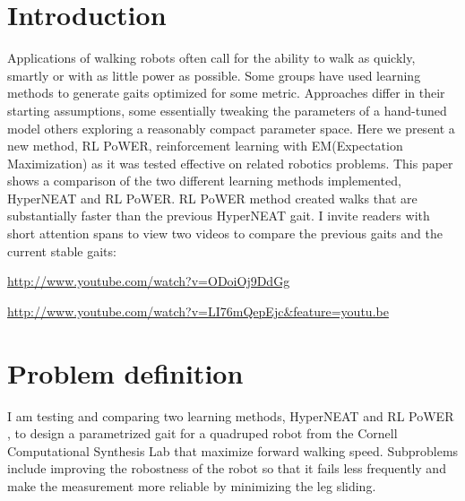 \section{Introduction}


Applications of walking robots often call for the ability to walk as
quickly, smartly or with as little power as possible. Some groups have
used learning methods to generate gaits optimized for some metric.
Approaches differ in their starting assumptions, some essentially
tweaking the parameters of a hand-tuned model others
exploring a reasonably compact parameter space.
Here we present a new method, RL PoWER, reinforcement learning with EM(Expectation Maximization) as it was tested effective on related robotics problems. 
This paper shows a comparison of the two different learning methods 
implemented, HyperNEAT and RL PoWER.  RL PoWER
method created walks that are substantially faster than the previous
HyperNEAT gait. I invite readers with short attention spans to view
two videos to compare the previous gaits and the current stable gaits:

\url{http://www.youtube.com/watch?v=ODoiOj9DdGg}

\url{http://www.youtube.com/watch?v=LI76mQepEjc&feature=youtu.be}




\section{Problem definition}

I am testing and comparing two learning methods, HyperNEAT and RL PoWER
, to design a parametrized gait for a quadruped robot from the Cornell
Computational Synthesis Lab that maximize forward walking speed. 
Subproblems include improving the robostness of the robot so that it 
fails less frequently and make the measurement more reliable by minimizing the leg sliding. 

